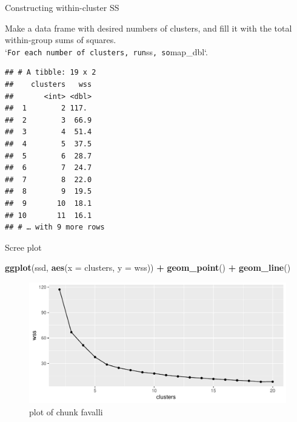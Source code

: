 \documentclass[ignorenonframetext,]{beamer}
\newenvironment{Shaded}{\begin{snugshade}}{\end{snugshade}}
\newcommand{\DataTypeTok}[1]{\textcolor[rgb]{0.13,0.29,0.53}{#1}}
\newcommand{\DecValTok}[1]{\textcolor[rgb]{0.00,0.00,0.81}{#1}}
\newcommand{\KeywordTok}[1]{\textcolor[rgb]{0.13,0.29,0.53}{\textbf{#1}}}
\newcommand{\NormalTok}[1]{#1}
\newcommand{\OperatorTok}[1]{\textcolor[rgb]{0.81,0.36,0.00}{\textbf{#1}}}
\newcommand{\StringTok}[1]{\textcolor[rgb]{0.31,0.60,0.02}{#1}}
\begin{document}
\begin{frame}[fragile]{Constructing within-cluster SS}
\protect\hypertarget{constructing-within-cluster-ss}{}

Make a data frame with desired numbers of clusters, and fill it with the
total within-group sums of squares.
`\texttt{For\ each\ number\ of\ clusters,\ run}ss\texttt{\textquotesingle{}\textquotesingle{},\ so}map\_dbl`.

\begin{Shaded}
\end{Shaded}

\begin{verbatim}
## # A tibble: 19 x 2
##    clusters   wss
##       <int> <dbl>
##  1        2 117. 
##  2        3  66.9
##  3        4  51.4
##  4        5  37.5
##  5        6  28.7
##  6        7  24.7
##  7        8  22.0
##  8        9  19.5
##  9       10  18.1
## 10       11  16.1
## # … with 9 more rows
\end{verbatim}

\end{frame}

\begin{frame}[fragile]{Scree plot}
\protect\hypertarget{scree-plot}{}

\begin{Shaded}
\begin{Highlighting}[]
\KeywordTok{ggplot}\NormalTok{(ssd, }\KeywordTok{aes}\NormalTok{(}\DataTypeTok{x =}\NormalTok{ clusters, }\DataTypeTok{y =}\NormalTok{ wss)) }\OperatorTok{+}\StringTok{ }\KeywordTok{geom_point}\NormalTok{() }\OperatorTok{+}
\StringTok{  }\KeywordTok{geom_line}\NormalTok{()}
\end{Highlighting}
\end{Shaded}

\begin{figure}
\centering
\includegraphics{figure/favalli-1.pdf}
\caption{plot of chunk favalli}
\end{figure}

\end{frame}
\end{document}
